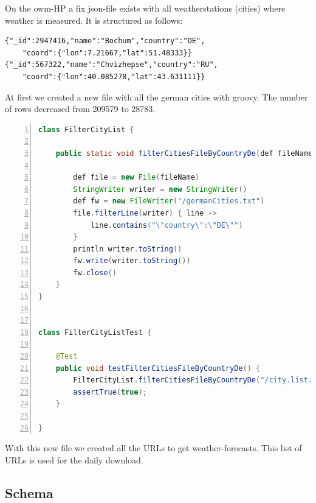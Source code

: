 \documentclass[paper=a4, fontsize=11pt]{article} %
\numberwithin{equation}{section} %
\numberwithin{figure}{section} %
\numberwithin{table}{section} %
\begin{document}
On the owm-HP a fix json-file exists with all weatherstations (cities) where weather is measured. It is structured as follows:\newline
 \begin{lstlisting}
{"_id":2947416,"name":"Bochum","country":"DE",
	"coord":{"lon":7.21667,"lat":51.48333}}
{"_id":567322,"name":"Chvizhepse","country":"RU",
	"coord":{"lon":40.085278,"lat":43.631111}}
\end{lstlisting}
At first we created a new file with all the german cities with groovy. The number of rows decreased from 209579 to 28783.
\newpage
{}

\begin{lstlisting}[language=java, 		% Setzt die Sprache
	basicstyle=\scriptsize\ttfamily, 	% Setzt den Standardstil
	keywordstyle=\color{red}\bfseries,	% Setzt den Stil für Schlüsselwörter
	identifierstyle=\color{blue},		% Identifier bekommen keine gesonderte formatierung
	commentstyle=\color{DarkGreen},		% Stil für Kommentare
	stringstyle=\ttfamily, 				% Stil für Strings (gekennzeichnet mit "String")
	breaklines=true, 					% Zeilen werden umgebrochen
	numbers=left, 						% Zeilennummern links
	numberstyle=\tiny, 					% Stil für die Seitennummern
	frame=single, 						% Rahmen
	backgroundcolor=\color{myGrey}, 	% Hintergrundfarbe
	caption={groovy-code for cityfilter},	% Caption
	tabsize=2							% Größe der Tabulatoren
	]
class FilterCityList {

	public static void filterCitiesFileByCountryDe(def fileName){

		def file = new File(fileName)
		StringWriter writer = new StringWriter()
		def fw = new FileWriter("/germanCities.txt")
		file.filterLine(writer) { line ->
			line.contains("\"country\":\"DE\"")
		}
		println writer.toString()
		fw.write(writer.toString())
		fw.close()
	}
}


class FilterCityListTest {

	@Test
	public void testFilterCitiesFileByCountryDe() {
		FilterCityList.filterCitiesFileByCountryDe("/city.list.json")
		assertTrue(true);
	}

}
\end{lstlisting}

With this new file we created all the URLs to get weather-forecasts. This list of URLs is used for the daily download.

\subsection{Schema}
\end{document}
